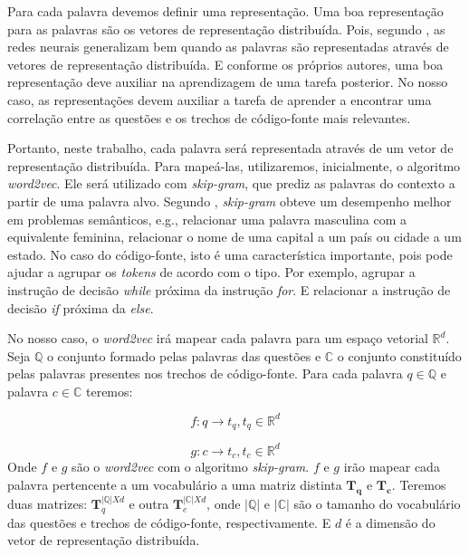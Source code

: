 Para cada palavra devemos definir uma representação. Uma boa representação para as palavras são os vetores de representação distribuída. Pois, segundo \cite{Goodfellow-et-al-2016:representation-learning}, as redes neurais generalizam bem quando as palavras são representadas através de vetores de representação distribuída. E conforme os próprios autores, uma boa representação deve auxiliar na aprendizagem de uma tarefa posterior. No nosso caso, as representações devem auxiliar a tarefa de aprender a encontrar uma correlação entre as questões e os trechos de código-fonte mais relevantes.

Portanto, neste trabalho, cada palavra será representada através de um vetor de representação distribuída. Para mapeá-las, utilizaremos, inicialmente, o algoritmo \textit{word2vec}. Ele será utilizado com \textit{skip-gram}, que prediz as palavras do contexto a partir de uma palavra alvo. Segundo \cite{mikolov2013distributed}, \textit{skip-gram} obteve um desempenho melhor em problemas semânticos, e.g., relacionar uma palavra masculina com a equivalente feminina, relacionar o nome de uma capital a um país ou cidade a um estado. No caso do código-fonte, isto é uma característica importante, pois pode ajudar a agrupar os \textit{tokens} de acordo com o tipo. Por exemplo, agrupar a instrução de decisão \textit{while} próxima da instrução \textit{for}. E relacionar a instrução de decisão \textit{if} próxima da \textit{else}.

No nosso caso, o \textit{word2vec} irá mapear cada palavra para um espaço vetorial $\mathbb{R}^{d}$. Seja $\mathbb{Q}$ o conjunto formado pelas palavras das questões e $\mathbb{C}$ o conjunto constituído pelas palavras presentes nos trechos de código-fonte. Para cada palavra ${q} \in \mathbb{Q}$ e palavra ${c} \in \mathbb{C}$ teremos:

\begin{equation}
    f: {q} \rightarrow t_{q}, t_{q} \in \mathbb{R}^{d}
\end{equation}

\begin{equation}
    g: {c} \rightarrow t_{c}, t_{c} \in \mathbb{R}^{d}
\end{equation}
Onde $f$ e $g$ são o \textit{word2vec} com o algoritmo \textit{skip-gram}. $f$ e $g$ irão mapear cada palavra pertencente a um vocabulário a uma matriz distinta $\bm{T_{q}}$ e $\bm{T_{c}}$.
Teremos duas matrizes: $\bm{T}_{q}^{|\mathbb{Q}| X d}$ e outra $\bm{T}_{c}^{|\mathbb{C}| X d}$, onde $|\mathbb{Q}|$ e $|\mathbb{C}|$ são o tamanho do vocabulário das questões e trechos de código-fonte, respectivamente. E $d$ é a dimensão do vetor de representação distribuída.

